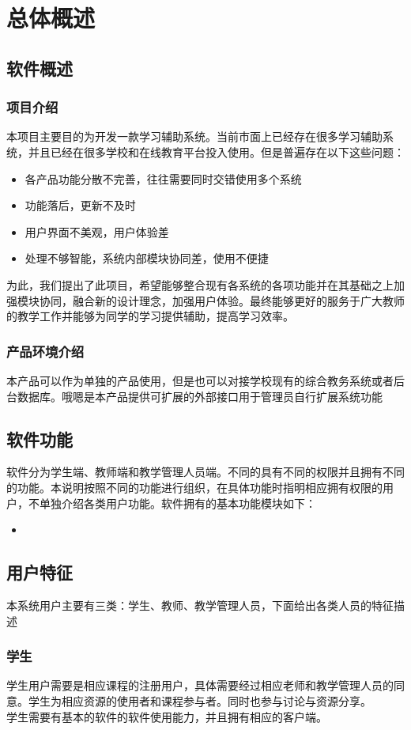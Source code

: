 \chapter{总体概述}
\section{软件概述}
\subsection{项目介绍}
本项目主要目的为开发一款学习辅助系统。当前市面上已经存在很多学习辅助系统，并且已经在很多学校和在线教育平台投入使用。但是普遍存在以下这些问题：\\
\begin{itemize}
  \item 各产品功能分散不完善，往往需要同时交错使用多个系统
  \item 功能落后，更新不及时
  \item 用户界面不美观，用户体验差
  \item 处理不够智能，系统内部模块协同差，使用不便捷
\end{itemize}
为此，我们提出了此项目，希望能够整合现有各系统的各项功能并在其基础之上加强模块协同，融合新的设计理念，加强用户体验。最终能够更好的服务于广大教师的教学工作并能够为同学的学习提供辅助，提高学习效率。

\subsection{产品环境介绍}
本产品可以作为单独的产品使用，但是也可以对接学校现有的综合教务系统或者后台数据库。哦嗯是本产品提供可扩展的外部接口用于管理员自行扩展系统功能

\section{软件功能}
软件分为学生端、教师端和教学管理人员端。不同的具有不同的权限并且拥有不同的功能。本说明按照不同的功能进行组织，在具体功能时指明相应拥有权限的用户，不单独介绍各类用户功能。软件拥有的基本功能模块如下：
\begin{itemize}
  \item
\end{itemize}
\section{用户特征}
本系统用户主要有三类：学生、教师、教学管理人员，下面给出各类人员的特征描述
\subsection{学生}
学生用户需要是相应课程的注册用户，具体需要经过相应老师和教学管理人员的同意。学生为相应资源的使用者和课程参与者。同时也参与讨论与资源分享。\\
学生需要有基本的软件的软件使用能力，并且拥有相应的客户端。
